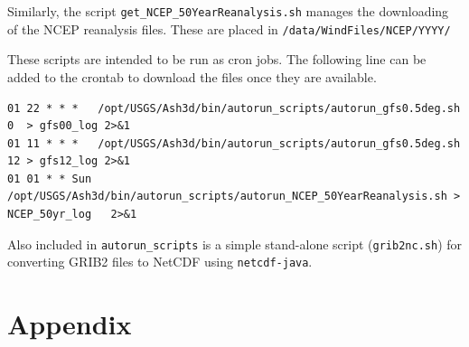\documentclass[11pt]{article}   %
\begin{document}
Similarly, the script \texttt{get\_NCEP\_50YearReanalysis.sh} manages the downloading of 
the NCEP reanalysis files.  These are placed in \texttt{/data/WindFiles/NCEP/YYYY/}

These scripts are intended to be run as cron jobs.  The following line can be added to the
crontab to download the files once they are available.
\footnotesize
\begin{verbatim}
01 22 * * *   /opt/USGS/Ash3d/bin/autorun_scripts/autorun_gfs0.5deg.sh 0  > gfs00_log 2>&1
01 11 * * *   /opt/USGS/Ash3d/bin/autorun_scripts/autorun_gfs0.5deg.sh 12 > gfs12_log 2>&1
01 01 * * Sun /opt/USGS/Ash3d/bin/autorun_scripts/autorun_NCEP_50YearReanalysis.sh > NCEP_50yr_log   2>&1
\end{verbatim}
\normalsize

Also included in \texttt{autorun\_scripts} is a simple stand-alone script (\texttt{grib2nc.sh})
for converting GRIB2 files to NetCDF using \texttt{netcdf-java}.

\clearpage

\section{Appendix}
\end{document}
